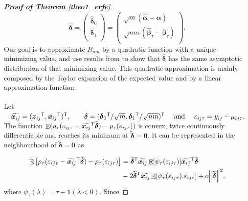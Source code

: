 \documentclass[15pt,a4paper]{article}
\DeclareMathOperator{\E}{\mathbb{E}}
\newcommand{\norm}[1]{\left\lVert#1\right\rVert}
\newcommand{\transpose}{{}^{\text{\sffamily T}}}
\newcommand{\smallO}{o}
\begin{document}
\begin{proof}[\textbf{Proof of Theorem \ref{theo1_erfe}}]
\begin{equation}\label{delta_erfe}
\widehat{\boldsymbol{\delta}}=
\begin{pmatrix}
\widehat{\boldsymbol{\delta}}_0\\
\widehat{\boldsymbol{\delta}}_1\\
\end{pmatrix}
=
\begin{pmatrix}
\sqrt{m}(\widehat{\boldsymbol{\alpha}}-\boldsymbol{\alpha})\\
\sqrt{nm}(\widehat{\boldsymbol{\beta}}_{\tau}-\boldsymbol{\beta}_{\tau})\\
\end{pmatrix}.
\end{equation}
Our goal is to approximate $R_{nm}$ by a quadratic function with a unique minimizing value, and use results from \citet{hjort_asymptotics_2011} to show that $\widehat{\boldsymbol{\delta}}$ has the same asymptotic distribution of that minimizing value. This quadratic approximation is mainly composed by the Taylor expansion of the expected value and by a linear approximation function.
~~\\ 
~~\\
Let $\quad \widetilde{\boldsymbol{x}_{ij}}=(\boldsymbol{z}_{ij}\transpose,\boldsymbol{x}_{ij}\transpose)
\transpose, \qquad \widetilde{\boldsymbol{\delta}}=(\boldsymbol{\delta}_0\transpose/\sqrt{m},
\boldsymbol{\delta}_1\transpose/\sqrt{nm})\transpose\quad \mbox{ and } \quad \varepsilon_{ij\tau}=y_{ij}-\mu_{ij\tau}.$ The function $\E(\rho_\tau(\varepsilon_{ij\tau}-\widetilde{\boldsymbol{x}_{ij}}\transpose\widetilde{\boldsymbol{\delta}})-
\rho_\tau(\varepsilon_{ij\tau}))$ is convex, twice continuously differentiable and reaches its minimum at $\widetilde{\boldsymbol{\delta}}=\boldsymbol{0}.$ It can be represented in the neighbourhood of $\widetilde{\boldsymbol{\delta}}=\boldsymbol{0}$ as


\begin{equation}\label{Exploss1_erfe}
\begin{split}
    \E\big[\rho_\tau(\varepsilon_{ij\tau}-\widetilde{\boldsymbol{x}_{ij}}\transpose\widetilde{\boldsymbol{\delta}})-
    \rho_\tau(\varepsilon_{ij\tau})\big]&=\widetilde{\boldsymbol{\delta}}\transpose\widetilde{\boldsymbol{x}_{ij}}\E[\psi_\tau(\varepsilon_{ij\tau})]\widetilde{\boldsymbol{x}_{ij}}\transpose\widetilde{\boldsymbol{\delta}}  \\
    & -2\widetilde{\boldsymbol{\delta}}\transpose\widetilde{\boldsymbol{x}_{ij}}\E[\psi_\tau(\varepsilon_{ij\tau}).\varepsilon_{ij\tau}]   + \smallO{\norm{\widetilde{\boldsymbol{\delta}}}^2},
\end{split}
\end{equation}
where $\psi_\tau(\lambda)=\tau-\mathds{1}(\lambda<0).$ Since 



\end{proof}
\end{document}
